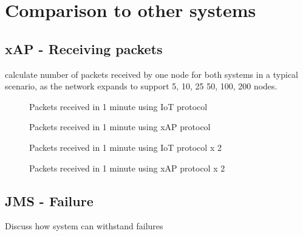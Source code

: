 
\section{Comparison to other systems} %
\label{sec:comparison_to_other_systems}

\subsection{xAP - Receiving packets} %
\label{sub:xap}
calculate number of packets received by one node for both systems in a typical scenario, as the network expands to support 5, 10, 25 50, 100, 200 nodes.


\begin{figure}[h]
\begin{center}
\begin{minipage}{.5\textwidth}

\caption{Packets received in 1 minute using IoT protocol}
\label{graph:IoT1}
\end{minipage}%
\begin{minipage}{.5\textwidth}

\caption{Packets received in 1 minute using xAP protocol}
\label{graph:IoT1}
\end{minipage}
\end{center}
\end{figure}



\begin{figure}[h]
\begin{center}
\begin{minipage}{.5\textwidth}

\caption{Packets received in 1 minute using IoT protocol x 2}
\label{graph:IoT2}
\end{minipage}%
\begin{minipage}{.5\textwidth}

\caption{Packets received in 1 minute using xAP protocol x 2}
\label{graph:IoT2}
\end{minipage}
\end{center}
\end{figure}

\subsection{JMS - Failure} %
\label{sub:jms_failure}
Discuss how system can withstand failures



